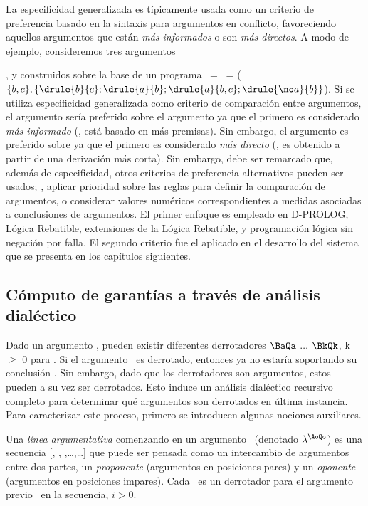 La especificidad generalizada es típicamente usada como un criterio de
preferencia basado en la sintaxis  para argumentos en conflicto,
favoreciendo aquellos argumentos que están \textit{más informados} o
son  \textit{más directos}. A modo de ejemplo, consideremos tres
argumentos

,  y
 construidos sobre la base de un
programa \PP\ = \SD\ =
($\{b,c\},\{\drule{b}{c};\drule{a}{b};\drule{a}{b,c};\drule{\no
a}{b}\}$). Si se utiliza especificidad generalizada como criterio de
comparación entre argumentos, el argumento  
sería preferido sobre el argumento  ya
que el primero es considerado \textit{más informado} (\ie, está basado
en más premisas). Sin embargo, el argumento   es preferido sobre
 ya que el primero es considerado
\textit{más directo} (\ie, es obtenido a partir de una derivación más
corta). Sin embargo, debe ser remarcado que, además de especificidad,
otros criterios de preferencia alternativos pueden ser usados;  \eg,
aplicar prioridad sobre las reglas para definir la comparación de
argumentos, o considerar valores  numéricos correspondientes a medidas
asociadas a conclusiones de argumentos. El primer enfoque es empleado
en {\footnotesize D}-P{\footnotesize ROLOG}, Lógica Rebatible,
extensiones de la Lógica Rebatible, y programación lógica sin negación
por falla. El segundo criterio fue el aplicado en el desarrollo del
sistema que se presenta en los capítulos siguientes.

\subsection{Cómputo de garantías a través de análisis dialéctico}
\label{sec:computo_garantias}

Dado un argumento \AQ, pueden existir diferentes derrotadores $\BaQa$
$\ldots$ $\BkQk$, k $\ge$ 0 para \AQ. Si el argumento \AQ\ es
derrotado, entonces ya no estaría soportando su conclusión \ArgQ.  Sin
embargo, dado que los derrotadores son argumentos, estos pueden a su
vez ser derrotados. Esto  induce un análisis dialéctico recursivo
completo para determinar qué argumentos son derrotados en  última
instancia. Para caracterizar este proceso, primero se introducen
algunas nociones auxiliares.

Una \textit{línea argumentativa} comenzando en un argumento \AoQo\
(denotado $\lambda^{\scriptsize \AoQo}$) es una secuencia [\AoQo,
\AaQa, \AbQb,\ldots,\AnQn\ldots] que puede ser pensada como un
intercambio de  argumentos entre dos partes, un \textit{proponente}
(argumentos en posiciones pares) y un \textit{oponente} (argumentos en
posiciones impares). Cada \AiQi\ es un derrotador para el argumento
previo \AimQim\ en la secuencia, $i > 0$.

